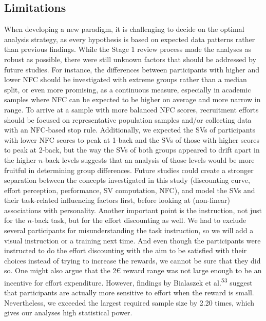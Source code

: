 \documentclass[
  man,floatsintext]{apa6}
\begin{document}
\hypertarget{limitations}{%
\subsection{Limitations}\label{limitations}}

When developing a new paradigm, it is challenging to decide on the optimal analysis strategy, as every hypothesis is based on expected data patterns rather than previous findings.
While the Stage 1 review process made the analyses as robust as possible, there were still unknown factors that should be addressed by future studies.
For instance, the differences between participants with higher and lower NFC should be investigated with extreme groups rather than a median split, or even more promising, as a continuous measure, especially in academic samples where NFC can be expected to be higher on average and more narrow in range.
To arrive at a sample with more balanced NFC scores, recruitment efforts should be focused on representative population samples and/or collecting data with an NFC-based stop rule.
Additionally, we expected the SVs of participants with lower NFC scores to peak at 1-back and the SVs of those with higher scores to peak at 2-back, but the way the SVs of both groups appeared to drift apart in the higher \(n\)-back levels suggests that an analysis of those levels would be more fruitful in determining group differences.
Future studies could create a stronger separation between the concepts investigated in this study (discounting curve, effort perception, performance, SV computation, NFC), and model the SVs and their task-related influencing factors first, before looking at (non-linear) associations with personality.
Another important point is the instruction, not just for the \(n\)-back task, but for the effort discounting as well.
We had to exclude several participants for misunderstanding the task instruction, so we will add a visual instruction or a training next time.
And even though the participants were instructed to do the effort discounting with the aim to be satisfied with their choices instead of trying to increase the rewards, we cannot be sure that they did so.
One might also argue that the 2€ reward range was not large enough to be an incentive for effort expenditure.
However, findings by Bialaszek et al.\textsuperscript{53} suggest that participants are actually more sensitive to effort when the reward is small.
Nevertheless, we exceeded the largest required sample size by 2.20 times, which gives our analyses high statistical power.
\end{document}
